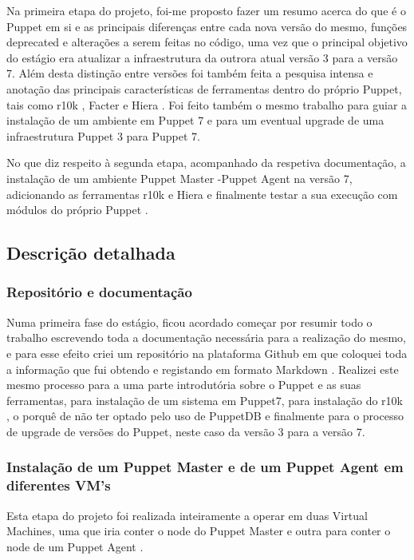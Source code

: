 \documentclass{article}
\begin{document}
Na primeira etapa do projeto, foi-me proposto fazer um resumo acerca do que é o Puppet \cite{puppet} em si e as principais diferenças entre cada nova versão do mesmo, funções deprecated e alterações a serem feitas no código, uma vez que o principal objetivo do estágio era atualizar a infraestrutura da outrora atual versão 3 para a versão 7. Além desta distinção entre versões foi também feita a pesquisa intensa e anotação das principais características de ferramentas dentro do próprio Puppet, tais como r10k \cite{r10k}, Facter \cite{facter} e Hiera \cite{hiera}. Foi feito também o mesmo trabalho para guiar a instalação de um ambiente em Puppet 7 e para um eventual upgrade de uma infraestrutura Puppet 3 para Puppet 7.

No que diz respeito à segunda etapa, acompanhado da respetiva documentação, a instalação de um ambiente Puppet Master \cite{puppet-master}-Puppet Agent \cite{puppet-agent} na versão 7, adicionando as ferramentas r10k \cite{r10k} e Hiera \cite{hiera} e finalmente testar a sua execução com módulos do próprio Puppet \cite{puppet}.

\subsection{Descrição detalhada}

\subsubsection{Repositório e documentação}
Numa primeira fase do estágio, ficou acordado começar por resumir todo o trabalho escrevendo toda a documentação necessária para a realização do mesmo, e para esse efeito criei um repositório na plataforma Github \cite{github} em que coloquei toda a informação que fui obtendo e registando em formato Markdown \cite{markdown}. Realizei este mesmo processo para a uma parte introdutória sobre o Puppet \cite{puppet} e as suas ferramentas, para instalação de um sistema em Puppet7, para instalação do r10k \cite{r10k}, o porquê de não ter optado pelo uso de PuppetDB \cite{puppetdb} e finalmente para o processo de upgrade de versões do Puppet, neste caso da versão 3 para a versão 7.

\subsubsection{Instalação de um Puppet Master e de um Puppet Agent em diferentes VM's}
Esta etapa do projeto foi realizada inteiramente a operar em duas Virtual Machines, uma que iria conter o node do Puppet Master \cite{puppet-master} e outra para conter o node de um  Puppet Agent \cite{puppet-agent}. 
\end{document}
